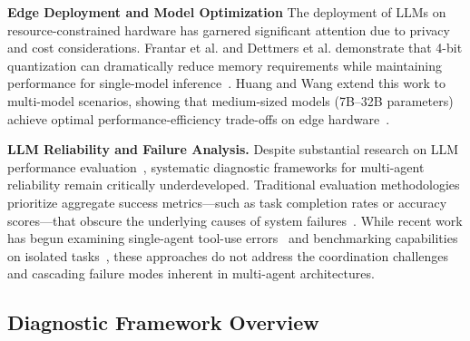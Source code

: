 \documentclass[conference]{IEEEtran}
\begin{document}
\noindent \textbf{Edge Deployment and Model Optimization}
The deployment of LLMs on resource-constrained hardware has garnered significant attention due to privacy and cost considerations. 
Frantar et al. and Dettmers et al. demonstrate that 4-bit quantization can dramatically reduce memory requirements while maintaining performance for single-model inference~\cite{frantar2023gptq,dettmers2023qlora}.
Huang and Wang extend this work to multi-model scenarios, showing that medium-sized models (7B–32B parameters) achieve optimal performance-efficiency trade-offs on edge hardware~\cite{huang2025llms}.

\noindent \textbf{LLM Reliability and Failure Analysis.}
Despite substantial research on LLM performance evaluation~\cite{hendrycks2021measuring,zheng2024judging,chen2021evaluating}, systematic diagnostic frameworks for multi-agent reliability remain critically underdeveloped. Traditional evaluation methodologies prioritize aggregate success metrics—such as task completion rates or accuracy scores—that obscure the underlying causes of system failures~\cite{kokane2024spectool}. While recent work has begun examining single-agent tool-use errors~\cite{kokane2024spectool} and benchmarking capabilities on isolated tasks~\cite{qin2023toolllm,schick2023toolformer}, these approaches do not address the coordination challenges and cascading failure modes inherent in multi-agent architectures. %

\subsection{Diagnostic Framework Overview}
\end{document}
